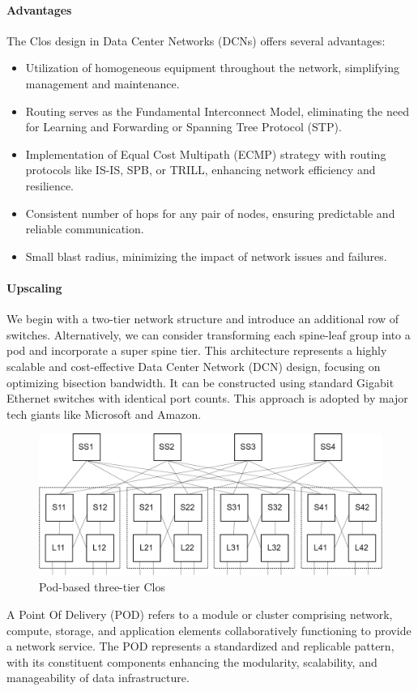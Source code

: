 \paragraph*{Advantages}
The Clos design in Data Center Networks (DCNs) offers several advantages:
\begin{itemize}
    \item Utilization of homogeneous equipment throughout the network, simplifying management and maintenance.
    \item Routing serves as the Fundamental Interconnect Model, eliminating the need for Learning and Forwarding or Spanning Tree Protocol (STP).
    \item Implementation of Equal Cost Multipath (ECMP) strategy with routing protocols like IS-IS, SPB, or TRILL, enhancing network efficiency and resilience.
    \item Consistent number of hops for any pair of nodes, ensuring predictable and reliable communication.
    \item Small blast radius, minimizing the impact of network issues and failures.
\end{itemize}

\paragraph*{Upscaling}
We begin with a two-tier network structure and introduce an additional row of switches. 
Alternatively, we can consider transforming each spine-leaf group into a pod and incorporate a super spine tier. 
This architecture represents a highly scalable and cost-effective Data Center Network (DCN) design, focusing on optimizing bisection bandwidth. 
It can be constructed using standard Gigabit Ethernet switches with identical port counts. 
This approach is adopted by major tech giants like Microsoft and Amazon.
\begin{figure}[H]
    \centering
    \includegraphics[width=0.6\linewidth]{images/pod.png}
    \caption{Pod-based three-tier Clos}
\end{figure}
A Point Of Delivery (POD) refers to a module or cluster comprising network, compute, storage, and application elements collaboratively functioning to provide a network service. 
The POD represents a standardized and replicable pattern, with its constituent components enhancing the modularity, scalability, and manageability of data infrastructure.

